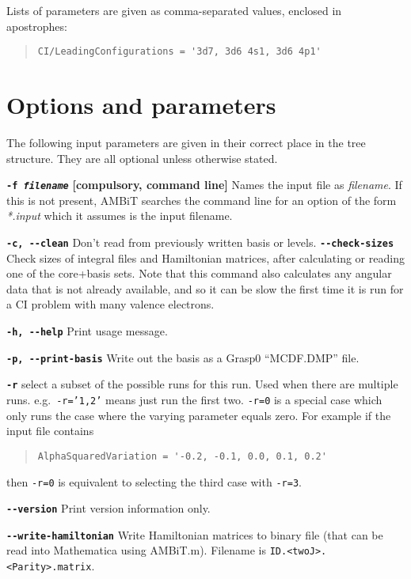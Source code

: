 \documentclass[a4paper,11pt]{article}
\newcommand{\option}[1]{\smallskip\noindent\textbf{\texttt{#1}}}
\newcommand{\code}[1]{\texttt{#1}}
\begin{document}
Lists of parameters are given as comma-separated values, enclosed in apostrophes:
\begin{quote}
\begin{verbatim}
CI/LeadingConfigurations = '3d7, 3d6 4s1, 3d6 4p1'
\end{verbatim}
\end{quote}

\newpage
\section{Options and parameters}
The following input parameters are given in their correct place in the tree structure. They are all optional unless otherwise stated.

\option{-f \emph{filename}} \textbf{[compulsory, command line]} Names the input file as \emph{filename}. If this is not present, AMBiT searches the command line for an option of the form \emph{*.input} which it assumes is the input filename. 

\option{-c, -{}-clean} Don't read from previously written basis or levels.
\option{-{}-check-sizes} Check sizes of integral files and Hamiltonian matrices, after calculating or reading one of the core+basis sets. Note that this command also calculates any angular data that is not already available, and so it can be slow the first time it is run for a CI problem with many valence electrons.

\option{-h, -{}-help} Print usage message.

\option{-p, -{}-print-basis} Write out the basis as a Grasp0 ``MCDF.DMP'' file.

\option{-r} select a subset of the possible runs for this run. Used when there are multiple runs. e.g.~\texttt{-r='1,2'} means just run the first two. \texttt{-r=0} is a special case which only runs the case where the varying parameter equals zero. For example if the input file contains

\begin{quote}
\begin{verbatim}
AlphaSquaredVariation = '-0.2, -0.1, 0.0, 0.1, 0.2'
\end{verbatim}
\end{quote}
then \texttt{-r=0} is equivalent to selecting the third case with \texttt{-r=3}.

\option{-{}-version} Print version information only.

\option{-{}-write-hamiltonian} Write Hamiltonian matrices to binary file (that can be read into Mathematica using AMBiT.m). Filename is \code{ID.<twoJ>.<Parity>.matrix}.
\end{document}
